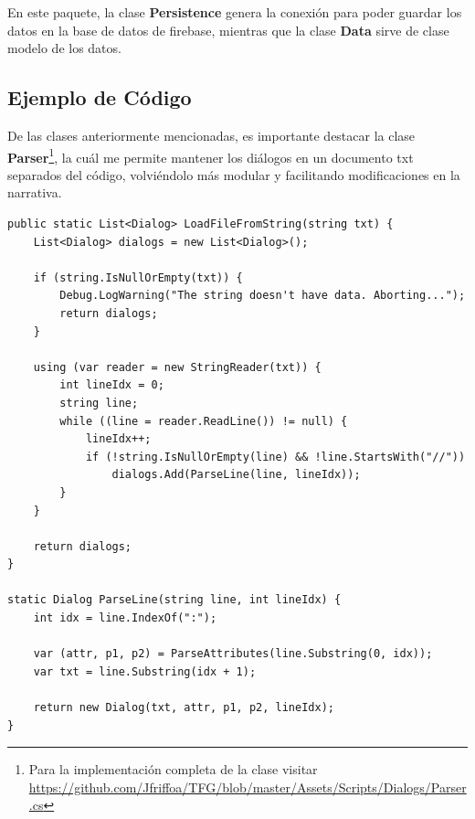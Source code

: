 En este paquete, la clase \textbf{Persistence} genera la conexión para poder guardar los datos en la base de datos de \Gls{firebase}, mientras que la clase \textbf{Data} sirve de clase modelo de los datos.

\subsection{Ejemplo de Código}
De las clases anteriormente mencionadas, es importante destacar la clase \textbf{Parser}\footnote{Para la implementación completa de la clase visitar \url{https://github.com/Jfriffoa/TFG/blob/master/Assets/Scripts/Dialogs/Parser.cs}}, la cuál me permite mantener los diálogos en un documento txt separados del código, volviéndolo más modular y facilitando modificaciones en la narrativa.

\begin{lstlisting}[language={[Sharp]C}, caption={Fragmento de Parser.cs}, label={lst:parser}]
public static List<Dialog> LoadFileFromString(string txt) {
    List<Dialog> dialogs = new List<Dialog>();

    if (string.IsNullOrEmpty(txt)) {
        Debug.LogWarning("The string doesn't have data. Aborting...");
        return dialogs;
    }

    using (var reader = new StringReader(txt)) {
        int lineIdx = 0;
        string line;
        while ((line = reader.ReadLine()) != null) {
            lineIdx++;
            if (!string.IsNullOrEmpty(line) && !line.StartsWith("//"))
                dialogs.Add(ParseLine(line, lineIdx));
        }
    }

    return dialogs;
}

static Dialog ParseLine(string line, int lineIdx) {
    int idx = line.IndexOf(":");

    var (attr, p1, p2) = ParseAttributes(line.Substring(0, idx));
    var txt = line.Substring(idx + 1);

    return new Dialog(txt, attr, p1, p2, lineIdx);
}
\end{lstlisting}

